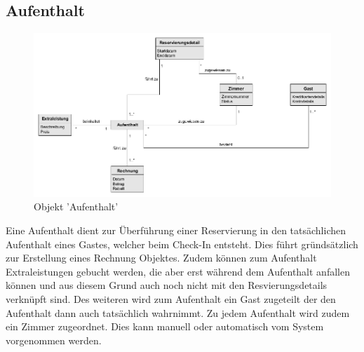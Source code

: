 \documentclass[../../Pflichtenheft.tex]{subfiles}
\begin{document}
    \subsection{Aufenthalt}
    \begin{figure}[ht!]
        \begin{center}
            \includegraphics[width=0.5\linewidth]{assets/aufenthalt.png}
            \caption{Objekt 'Aufenthalt'} \label{aufenthalt_model}
        \end{center}
    \end{figure}
    Eine Aufenthalt dient zur Überführung einer Reservierung in den tatsächlichen Aufenthalt eines
    Gastes, welcher beim Check-In entsteht. Dies führt gründsätzlich zur Erstellung eines Rechnung
    Objektes. Zudem können zum Aufenthalt Extraleistungen gebucht werden, die aber erst während dem
    Aufenthalt anfallen können und aus diesem Grund auch noch nicht mit den Resvierungsdetails verknüpft sind.
    Des weiteren wird zum Aufenthalt ein Gast zugeteilt der den Aufenthalt dann auch tatsächlich wahrnimmt.
    Zu jedem Aufenthalt wird zudem ein Zimmer zugeordnet. Dies kann manuell oder automatisch vom System vorgenommen
    werden.
\end{document}
